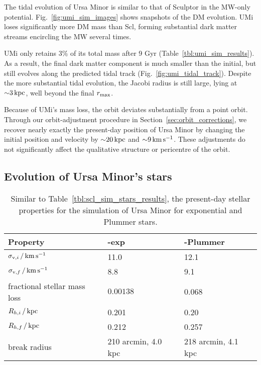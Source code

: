 The tidal evolution of Ursa Minor is similar to that of Sculptor in the
MW-only potential. Fig.~\ref{fig:umi_sim_images} shows snapshots of the
DM evolution. UMi loses significantly more DM mass than Scl, forming
substantial dark matter streams encircling the MW several times.

UMi only retains 3\% of its total mass after 9 Gyr
(Table~\ref{tbl:umi_sim_results}). As a result, the final dark matter
component is much smaller than the initial, but still evolves along the
predicted tidal track (Fig.~\ref{fig:umi_tidal_track}). Despite the more
substantial tidal evolution, the Jacobi radius is still large, lying at
\({\sim} 3\,{\rm kpc}\), well beyond the final \(r_{\rm max}\).

Because of UMi's mass loss, the orbit deviates substantially from a
point orbit. Through our orbit-adjustment procedure in
Section~\ref{sec:orbit_corrections}, we recover nearly exactly the
present-day position of Ursa Minor by changing the initial position and
velocity by \({\sim} 20\,{\rm kpc}\) and \({\sim} 9\,{\rm km\,s^{-1}}\). These
adjustments do not significantly affect the qualitative structure or
pericentre of the orbit.

\subsection{Evolution of Ursa Minor's
stars}\label{evolution-of-ursa-minors-stars}

\begin{table*}[t]
\centering
\caption[Simulation results for Ursa Minor’s stars]{Similar to Table \ref{tbl:scl_sim_stars_results}, the present-day stellar properties for the simulation of Ursa Minor for exponential and Plummer stars. }
\label{tbl:umi_sim_stars_results}
\begin{tabular}{lll}
\toprule
Property & \smallperi{}-exp & \smallperi{}-Plummer\\
\midrule
$\sigma_{{\rm v}, i}\,/\,{\rm km\,s^{-1}}$ & 11.0 & 12.1\\
$\sigma_{{\rm v}, f}\,/\,{\rm km\,s^{-1}}$ & 8.8 & 9.1\\
fractional stellar mass loss & $0.00138$ & 0.068\\
$R_{h, i}\,/\,{\rm kpc}$ & 0.201 & 0.20\\
$R_{h, f}\,/\,{\rm kpc}$ & 0.212 & 0.257\\
break radius & 210 arcmin, 4.0 kpc & 218 arcmin, 4.1 kpc\\
\bottomrule
\end{tabular}
\end{table*}

